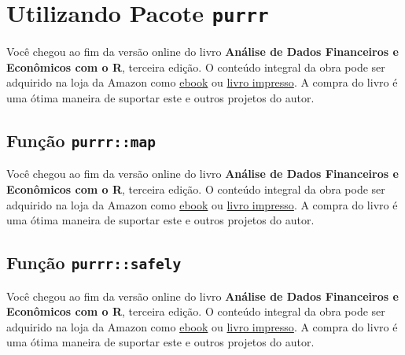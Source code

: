 \documentclass[
  11pt,
]{book}
\newenvironment{pleasebuyit}
{\begin{noteblock}
		
	} {\end{noteblock}}
\begin{document}
\hypertarget{utilizando-pacote-purrr}{%
\section{\texorpdfstring{Utilizando Pacote \texttt{purrr}}{Utilizando Pacote purrr}}\label{utilizando-pacote-purrr}}

\begin{pleasebuyit}
Você chegou ao fim da versão online do livro \textbf{Análise de Dados
Financeiros e Econômicos com o R}, terceira edição. O conteúdo integral
da obra pode ser adquirido na loja da Amazon como
\href{https://www.amazon.com.br/dp/B08WNC27ZY}{ebook} ou
\href{https://www.amazon.com/dp/B08WP8CCDB}{livro impresso}. A compra do
livro é uma ótima maneira de suportar este e outros projetos do autor.
\end{pleasebuyit}

\hypertarget{funuxe7uxe3o-purrrmap}{%
\subsection{\texorpdfstring{Função \texttt{purrr::map}}{Função purrr::map}}\label{funuxe7uxe3o-purrrmap}}

\begin{pleasebuyit}
Você chegou ao fim da versão online do livro \textbf{Análise de Dados
Financeiros e Econômicos com o R}, terceira edição. O conteúdo integral
da obra pode ser adquirido na loja da Amazon como
\href{https://www.amazon.com.br/dp/B08WNC27ZY}{ebook} ou
\href{https://www.amazon.com/dp/B08WP8CCDB}{livro impresso}. A compra do
livro é uma ótima maneira de suportar este e outros projetos do autor.
\end{pleasebuyit}

\hypertarget{funuxe7uxe3o-purrrsafely}{%
\subsection{\texorpdfstring{Função \texttt{purrr::safely}}{Função purrr::safely}}\label{funuxe7uxe3o-purrrsafely}}

\begin{pleasebuyit}
Você chegou ao fim da versão online do livro \textbf{Análise de Dados
Financeiros e Econômicos com o R}, terceira edição. O conteúdo integral
da obra pode ser adquirido na loja da Amazon como
\href{https://www.amazon.com.br/dp/B08WNC27ZY}{ebook} ou
\href{https://www.amazon.com/dp/B08WP8CCDB}{livro impresso}. A compra do
livro é uma ótima maneira de suportar este e outros projetos do autor.
\end{pleasebuyit}
\end{document}
